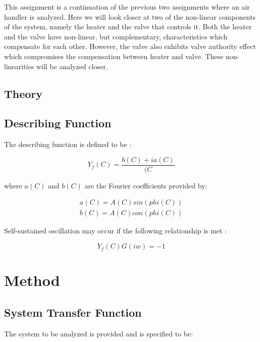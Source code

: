 \documentclass[a4paper, titlepage]{article}
\begin{document}
This assignment is a continuation of the previous two assignments where an air handler is analyzed.
Here we will look closer at two of the non-linear components of the system, namely the heater and the valve that controls it.
Both the heater and the valve have non-linear, but complementary, characteristics which compensate for each other.  However, the valve also exhibits valve authority effect which compromises the compensation between heater and valve.  These non-linearities will be analyzed closer. 
\citep[p.123]{glad00}

\subsection{Theory}

\subsection{Describing Function}

The describing function is defined to be \citep[p. 358]{glad00}:

\begin{equation}
	Y_{f}(C) = \frac{b(C)+ia(C)}{(C}
	\label{equ:descrbingFunction}
\end{equation}

where $a(C)$ and $b(C)$ are the Fourier coefficients provided by:

\begin{equation}
\begin{split}
	a(C) = A(C)sin( phi(C) ) \\
	b(C) = A(C)con( phi(C) )
\end{split}
\label{equ:fourier}
\end{equation}

Self-sustained oscillation may occur if the following relationship is met \citep[p. 359]{glad00}:

\begin{equation}
	Y_{f}(C)G(iw) = -1
\label{equ:selfOsc}
\end{equation}
 
\section{Method}
\subsection{System Transfer Function}
The system to be analyzed is provided and is specified to be:
\end{document}
